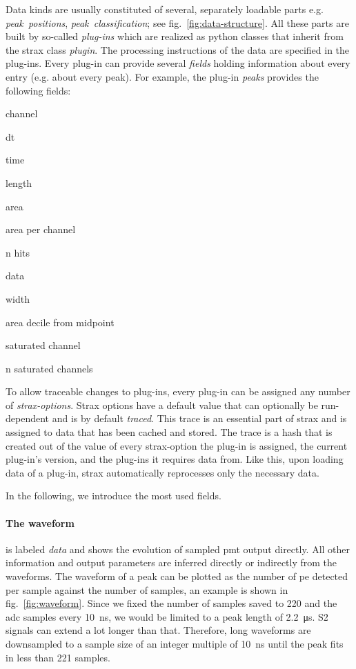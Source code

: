 Data kinds are usually constituted of several, separately loadable parts e.g. \emph{peak~positions}, \emph{peak~classification}; see fig.~\ref{fig:data-structure}.
All these parts are built by so-called \emph{plug-ins} which are realized as python classes that inherit from the strax class \emph{plugin}.
The processing instructions of the data are specified in the plug-ins.
Every plug-in can provide several \emph{fields} holding information about every entry (e.g. about every peak).
For example, the plug-in \emph{peaks} provides the following fields:
\begin{AutoMultiColItemize}
        \item{channel}
        \item{dt}
        \item{time}
        \item{length}
        \item{area}
        \item{area per channel}
        \item{n hits}
        \item{data}
        \item{width}
        \item{area decile from midpoint}
        \item{saturated channel}
        \item{n saturated channels}
\end{AutoMultiColItemize}
To allow traceable changes to plug-ins, every plug-in can be assigned any number of \emph{strax-options}.
Strax options have a default value that can optionally be run-dependent and is by default \emph{traced}.
This trace is an essential part of strax and is assigned to data that has been cached and stored.
The trace is a hash that is created out of the value of every strax-option the plug-in is assigned, the current plug-in's version, and the plug-ins it requires data from.
Like this, upon loading data of a plug-in, strax automatically reprocesses only the necessary data.



In the following, we introduce the most used fields.

\paragraph{The waveform} is labeled \emph{data} and shows the evolution of sampled \gls{pmt} output directly.
All other information and output parameters are inferred directly or indirectly from the waveforms.
The waveform of a peak can be plotted as the number of \gls{pe} detected per sample against the number of samples, an example is shown in fig.~\ref{fig:waveform}.
Since we fixed the number of samples saved to 220 and the \gls{adc} samples every \SI{10}{\nano\second}, we would be limited to a peak length of \SI{2.2}{\micro\second}.
S2 signals can extend a lot longer than that.
Therefore, long waveforms are downsampled to a sample size of an integer multiple of \SI{10}{\nano\second} until the peak fits in less than 221 samples.

